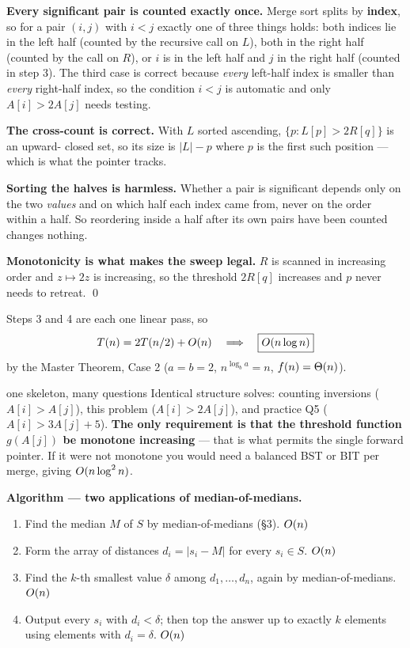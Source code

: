 \begin{correct}
\textbf{Every significant pair is counted exactly once.} Merge sort splits by \textbf{index}, so
for a pair $(i,j)$ with $i<j$ exactly one of three things holds: both indices lie in the left
half (counted by the recursive call on $L$), both in the right half (counted by the call on $R$),
or $i$ is in the left half and $j$ in the right half (counted in step 3). The third case is
correct because \emph{every} left-half index is smaller than \emph{every} right-half index, so the
condition $i<j$ is automatic and only $A[i]>2A[j]$ needs testing.

\textbf{The cross-count is correct.} With $L$ sorted ascending, $\{p:L[p]>2R[q]\}$ is an upward-
closed set, so its size is $|L|-p$ where $p$ is the first such position --- which is what the
pointer tracks.

\textbf{Sorting the halves is harmless.} Whether a pair is significant depends only on the two
\emph{values} and on which half each index came from, never on the order within a half. So
reordering inside a half after its own pairs have been counted changes nothing.

\textbf{Monotonicity is what makes the sweep legal.} $R$ is scanned in increasing order and
$z\mapsto2z$ is increasing, so the threshold $2R[q]$ increases and $p$ never needs to retreat.
\qed
\end{correct}

\begin{cplx}
Steps 3 and 4 are each one linear pass, so
\[
  T(n)=2T(n/2)+O(n) \quad\Longrightarrow\quad \boxed{O(n\log n)}
\]
by the Master Theorem, Case 2 ($a=b=2$, $n^{\log_b a}=n$, $f(n)=\Theta(n)$).
\end{cplx}

\begin{facts}{one skeleton, many questions}
Identical structure solves: counting inversions ($A[i]>A[j]$), this problem ($A[i]>2A[j]$), and
practice Q5 ($A[i]>3A[j]+5$). \textbf{The only requirement is that the threshold function
$g(A[j])$ be monotone increasing} --- that is what permits the single forward pointer. If it were
not monotone you would need a balanced BST or BIT per merge, giving $O(n\log^2n)$.
\end{facts}

\textbf{Algorithm --- two applications of median-of-medians.}
\begin{enumerate}
  \item Find the median $M$ of $S$ by median-of-medians (\S3). \hfill $O(n)$
  \item Form the array of distances $d_i=|s_i-M|$ for every $s_i\in S$. \hfill $O(n)$
  \item Find the $k$-th smallest value $\delta$ among $d_1,\dots,d_n$, again by
        median-of-medians. \hfill $O(n)$
  \item Output every $s_i$ with $d_i<\delta$; then top the answer up to exactly $k$ elements using
        elements with $d_i=\delta$. \hfill $O(n)$
\end{enumerate}

